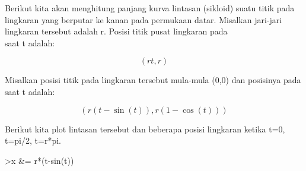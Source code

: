 \documentclass{article}
\begin{document}
\begin{eulernotebook}
\begin{eulercomment}
\begin{eulercomment}
\begin{eulercomment}
\begin{eulercomment}
\begin{eulercomment}
\begin{eulercomment}
\begin{eulercomment}
\begin{eulercomment}
\begin{eulercomment}
\begin{eulercomment}
\begin{eulercomment}
\begin{eulercomment}
\begin{eulercomment}
\begin{eulercomment}
\begin{eulercomment}
\begin{eulercomment}
\begin{eulercomment}
\begin{eulercomment}
\begin{eulercomment}
Berikut kita akan menghitung panjang kurva lintasan (sikloid) suatu
titik pada lingkaran yang berputar ke kanan pada permukaan datar.
Misalkan jari-jari lingkaran tersebut adalah r. Posisi titik pusat
lingkaran pada\\
saat t adalah:

\end{eulercomment}
\begin{eulerformula}
\[
(rt,r)
\]
\end{eulerformula}
\begin{eulercomment}
Misalkan posisi titik pada lingkaran tersebut mula-mula (0,0) dan
posisinya pada saat t adalah:

\end{eulercomment}
\begin{eulerformula}
\[
(r(t-\sin(t)),r(1-\cos(t)))
\]
\end{eulerformula}
\begin{eulercomment}
Berikut kita plot lintasan tersebut dan beberapa posisi lingkaran
ketika t=0, t=pi/2, t=r*pi.
\end{eulercomment}
\begin{eulerprompt}
>x &= r*(t-sin(t))
\end{eulerprompt}
\begin{euleroutput}
  

\end{euleroutput}
\end{eulercomment}
\end{eulercomment}
\end{eulercomment}
\end{eulercomment}
\end{eulercomment}
\end{eulercomment}
\end{eulercomment}
\end{eulercomment}
\end{eulercomment}
\end{eulercomment}
\end{eulercomment}
\end{eulercomment}
\end{eulercomment}
\end{eulercomment}
\end{eulercomment}
\end{eulercomment}
\end{eulercomment}
\end{eulercomment}
\end{eulernotebook}
\end{document}
